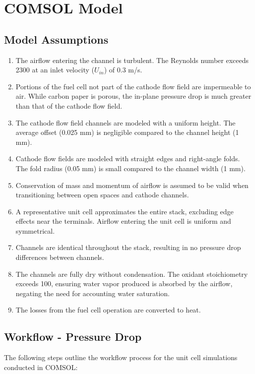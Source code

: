 \documentclass{report}
\begin{document}
\chapter{COMSOL Model}
    \section{Model Assumptions}
        \begin{enumerate}
            \item The airflow entering the channel is turbulent. The Reynolds number exceeds 2300 at an inlet velocity ($U_{in}$) of 0.3 m/s.
            \item Portions of the fuel cell not part of the cathode flow field are impermeable to air. While carbon paper is porous, the in-plane pressure drop is much greater than that of the cathode flow field.
            \item The cathode flow field channels are modeled with a uniform height. The average offset (0.025 mm) is negligible compared to the channel height (1 mm).
            \item Cathode flow fields are modeled with straight edges and right-angle folds. The fold radius (0.05 mm) is small compared to the channel width (1 mm).
            \item Conservation of mass and momentum of airflow is assumed to be valid when transitioning between open spaces and cathode channels.
            \item A representative unit cell approximates the entire stack, excluding edge effects near the terminals. Airflow entering the unit cell is uniform and symmetrical.
            \item Channels are identical throughout the stack, resulting in no pressure drop differences between channels.
            \item The channels are fully dry without condensation. The oxidant stoichiometry exceeds 100, ensuring water vapor produced is absorbed by the airflow, negating the need for accounting water saturation.
            \item The losses from the fuel cell operation are converted to heat. 
        \end{enumerate}

        \section{Workflow - Pressure Drop}
        The following steps outline the workflow process for the unit cell simulations conducted in COMSOL:
\end{document}
